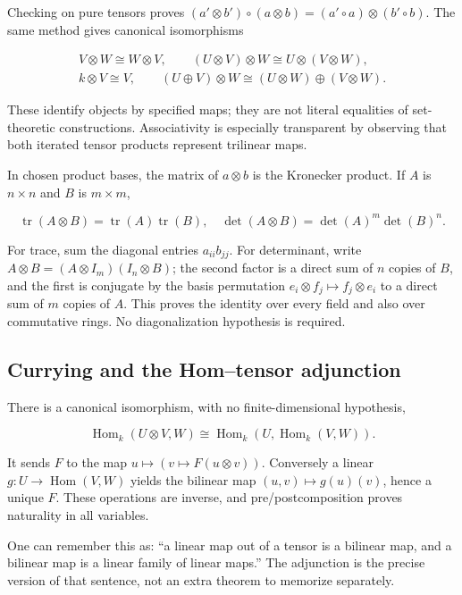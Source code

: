 \documentclass[
  11pt,
]{article}
\begin{document}
Checking on pure tensors proves
\((a'\otimes b')\circ(a\otimes b)=(a'\circ a)\otimes(b'\circ b)\). The
same method gives canonical isomorphisms

\[\begin{gathered}
V\otimes W\cong W\otimes V,\qquad
(U\otimes V)\otimes W\cong U\otimes(V\otimes W),\\
k\otimes V\cong V,\qquad
(U\oplus V)\otimes W\cong(U\otimes W)\oplus(V\otimes W).
\end{gathered}\]

These identify objects by specified maps; they are not literal
equalities of set-theoretic constructions. Associativity is especially
transparent by observing that both iterated tensor products represent
trilinear maps.

In chosen product bases, the matrix of \(a\otimes b\) is the Kronecker
product. If \(A\) is \(n\times n\) and \(B\) is \(m\times m\),

\[\operatorname{tr}(A\otimes B)=\operatorname{tr}(A)\operatorname{tr}(B),
\quad \det(A\otimes B)=\det(A)^m\det(B)^n.\]

For trace, sum the diagonal entries \(a_{ii}b_{jj}\). For determinant,
write \(A\otimes B=(A\otimes I_m)(I_n\otimes B)\); the second factor is
a direct sum of \(n\) copies of \(B\), and the first is conjugate by the
basis permutation \(e_i\otimes f_j\mapsto f_j\otimes e_i\) to a direct
sum of \(m\) copies of \(A\). This proves the identity over every field
and also over commutative rings. No diagonalization hypothesis is
required.

\subsection{Currying and the Hom--tensor
adjunction}\label{currying-and-the-homtensor-adjunction}

There is a canonical isomorphism, with no finite-dimensional hypothesis,

\[\operatorname{Hom}_k(U\otimes V,W)
\cong\operatorname{Hom}_k(U,\operatorname{Hom}_k(V,W)).\]

It sends \(F\) to the map \(u\mapsto(v\mapsto F(u\otimes v))\).
Conversely a linear \(g:U\to\operatorname{Hom}(V,W)\) yields the
bilinear map \((u,v)\mapsto g(u)(v)\), hence a unique \(F\). These
operations are inverse, and pre/postcomposition proves naturality in all
variables.

One can remember this as: ``a linear map out of a tensor is a bilinear
map, and a bilinear map is a linear family of linear maps.'' The
adjunction is the precise version of that sentence, not an extra theorem
to memorize separately.
\end{document}
